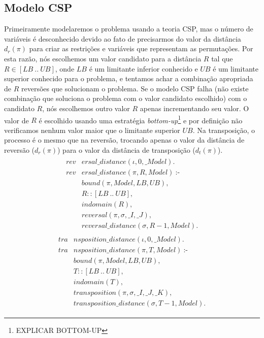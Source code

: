 \subsection{Modelo CSP}
\label{subsec:modelcsp}
Primeiramente modelaremos o problema usando a teoria CSP, mas o número
de variáveis é desconhecido devido ao fato de precisarmos do valor da
distância $d_{r}(\pi)$ para criar as restrições e variáveis que
representam as permutações. Por esta razão, nós escolhemos um valor
candidato para a distância $R$ tal que $R \in [LB~..~UB]$, onde $LB$ é
um limitante inferior conhecido e $UB$ é um limitante superior
conhecido para o problema, e tentamos achar a combinação apropriada de
$R$ reversões que solucionam o problema. Se o modelo CSP falha (não
existe combinação que soluciona o problema com o valor candidato
escolhido) com o candidato $R$, nós escolhemos outro valor $R$ apenas
incrementando seu valor. O valor de $R$ é escolhido usando uma
estratégia \textit{bottom-up}\footnote{EXPLICAR BOTTOM-UP} e por
definição não verificamos nenhum valor maior que o limitante superior
$UB$. Na transposição, o processo é o mesmo que na reversão, trocando
apenas o valor da distância de reversão ($d_{r}(\pi)$) para o valor da
distância de transposição ($d_{t}(\pi)$).
\begin{align}
  \label{revdistance}
  \begin{split}
  \textit{rev}&\textit{ersal\_distance}(\iota, 0, \_Model). \\
  \textit{rev}&\textit{ersal\_distance}(\pi, R, Model)~\text{:-} \\
  &\textit{bound}(\pi, Model, LB, UB), \\
  &R :: [LB~..~UB], \\
  &\textit{indomain}(R),  \\
  &\textit{reversal}(\pi, \sigma, \_I, \_J),  \\
  &\textit{reversal\_distance}(\sigma, R-1, Model). 
  \end{split}
\end{align}
\begin{align}
  \label{tradistance}
  \begin{split}
  \textit{tra}&\textit{nsposition\_distance}(\iota, 0, \_Model). \\
  \textit{tra}&\textit{nsposition\_distance}(\pi, T, Model)~\text{:-} \\
  &\textit{bound}(\pi, Model, LB, UB), \\
  &T :: [LB~..~UB], \\
  &\textit{indomain}(T),  \\
  &\textit{transposition}(\pi, \sigma, \_I, \_J, \_K),  \\
  &\textit{transposition\_distance}(\sigma, T-1, Model). 
  \end{split}
\end{align}

